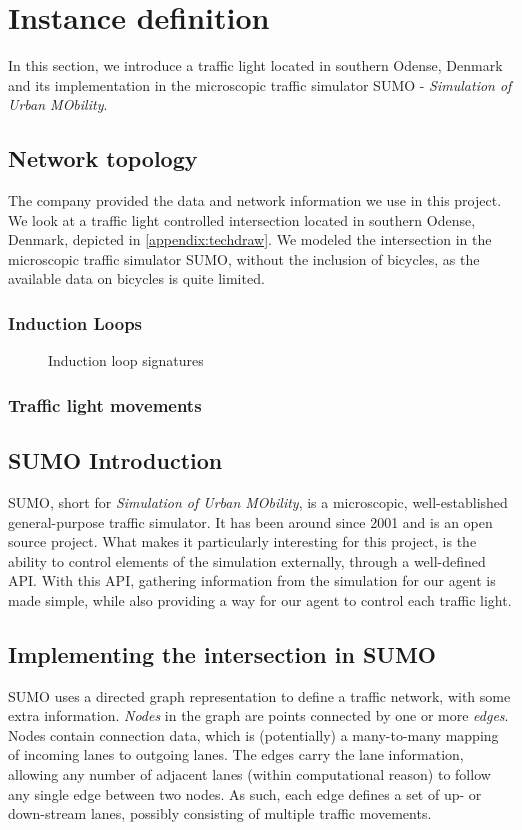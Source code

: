 \section{Instance definition}
In this section, we introduce a traffic light located in southern Odense, Denmark and its implementation in the microscopic traffic simulator SUMO - \textit{Simulation of Urban MObility}.

\subsection{Network topology}
The company \swarco provided the data and network information we use in this project. We look at a traffic light controlled intersection located in southern Odense, Denmark, depicted in \cref{appendix:techdraw}. We modeled the intersection in the microscopic traffic simulator SUMO, without the inclusion of bicycles, as the available data on bicycles is quite limited.

\subsubsection{Induction Loops}

\begin{figure}[!htb]
  \centering
  \caption{Induction loop signatures}
  \label{fig:inductionsignatures}
\end{figure}


\subsubsection{Traffic light movements}

\subsection{SUMO Introduction}
SUMO, short for \textit{Simulation of Urban MObility}, is a microscopic, well-established general-purpose traffic simulator. It has been around since 2001 and is an open source project. What makes it particularly interesting for this project, is the ability to control elements of the simulation externally, through a well-defined API. With this API, gathering information from the simulation for our agent is made simple, while also providing a way for our agent to control each traffic light.

\subsection{Implementing the intersection in SUMO}
SUMO uses a directed graph representation to define a traffic network, with some extra information. 
\textit{Nodes} in the graph are points connected by one or more \textit{edges}. Nodes contain connection data, which is (potentially) a many-to-many mapping of incoming lanes to outgoing lanes. The edges carry the lane information, allowing any number of adjacent lanes (within computational reason) to follow any single edge between two nodes. As such, each edge defines a set of up- or down-stream lanes, possibly consisting of multiple traffic movements.


